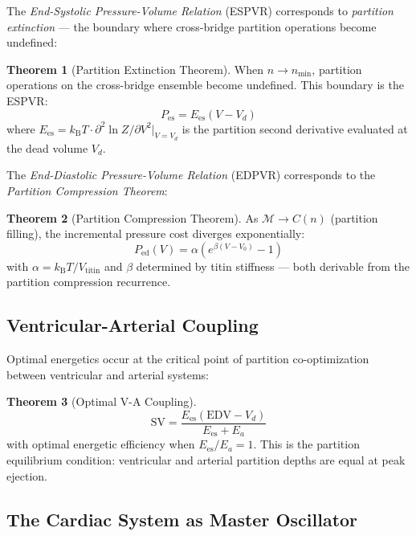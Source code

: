 \documentclass[12pt,a4paper]{article}
\theoremstyle{definition}
\newtheorem{theorem}{Theorem}
\newcommand{\kB}{k_{\text{B}}}
\newcommand{\kBT}{k_{\text{B}}T}
\begin{document}
The \emph{End-Systolic Pressure-Volume Relation} (ESPVR) corresponds to
\emph{partition extinction} — the boundary where cross-bridge partition
operations become undefined:

\begin{theorem}[Partition Extinction Theorem]
When $n \to n_{\min}$, partition operations on the cross-bridge ensemble
become undefined. This boundary is the ESPVR:
\begin{equation}
\boxed{P_{\text{es}} = E_{\text{es}}(V - V_d)}
\end{equation}
where $E_{\text{es}} = \kB T \cdot \partial^2 \ln Z / \partial V^2 \big|_{V=V_d}$
is the partition second derivative evaluated at the dead volume $V_d$.
\end{theorem}

The \emph{End-Diastolic Pressure-Volume Relation} (EDPVR) corresponds to
the \emph{Partition Compression Theorem}:

\begin{theorem}[Partition Compression Theorem]
As $\mathcal{M} \to C(n)$ (partition filling), the incremental pressure cost
diverges exponentially:
\begin{equation}
\boxed{P_{\text{ed}}(V) = \alpha\left(e^{\beta(V - V_0)} - 1\right)}
\end{equation}
with $\alpha = \kBT / V_{\text{titin}}$ and $\beta$ determined by titin
stiffness — both derivable from the partition compression recurrence.
\end{theorem}

\subsection{Ventricular-Arterial Coupling}

Optimal energetics occur at the critical point of partition co-optimization
between ventricular and arterial systems:

\begin{theorem}[Optimal V-A Coupling]
\begin{equation}
\text{SV} = \frac{E_{\text{es}}(\text{EDV} - V_d)}{E_{\text{es}} + E_a}
\end{equation}
with optimal energetic efficiency when $E_{\text{es}} / E_a = 1$.
This is the partition equilibrium condition: ventricular and arterial
partition depths are equal at peak ejection.
\end{theorem}

\subsection{The Cardiac System as Master Oscillator}
\end{document}
